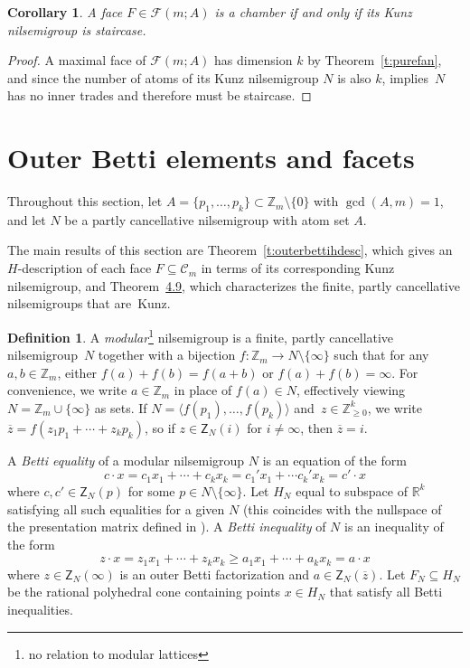 \documentclass[10pt,a4paper]{amsart}
\newcommand\ZZ{\mathbb{Z}}
\newcommand\RR{\mathbb{R}}
\newcommand\cC{{\mathcal C}}
\newtheorem{coro}[thm]{Corollary}
\theoremstyle{definition}\newtheorem{defi}[thm]{Definition}
\begin{document}
\begin{coro}\label{c:chamberstaircase}
A face $F \in \mathcal F(m;A)$ is a chamber if and only if its Kunz nilsemigroup is staircase.   
\end{coro}

\begin{proof}
A maximal face of $\mathcal F(m;A)$ has dimension $k$ by Theorem~\ref{t:purefan}, and since the number of atoms of its Kunz nilsemigroup $N$ is also $k$, \cite[Theorem~4.3]{kunzfaces3} implies~$N$ has no inner trades and therefore must be staircase.  
\end{proof}


\section{Outer Betti elements and facets}
\label{sec:facetouterbetti}

Throughout this section, let $A = \{p_1,\ldots,p_k\} \subset \ZZ_m \setminus \{0\}$ with $\gcd(A,m) = 1$, and let $N$ be a partly cancellative nilsemigroup with atom set $A$.

The main results of this section are Theorem~\ref{t:outerbettihdesc}, which gives an $H$-description of each face $F \subseteq \cC_m$ in terms of its corresponding Kunz nilsemigroup, and Theorem~\href{https://alco.centre-mersenne.org/articles/10.5802/alco.425/}{4.9}, which characterizes the finite, partly cancellative nilsemigroups that are~Kunz.  

\begin{defi}\label{d:modularnilsemigroup}
A \emph{modular}\footnote{no relation to modular lattices} nilsemigroup is a finite, partly cancellative nilsemigroup~$N$ together with a bijection $f : \ZZ_m \to N \setminus \{\infty\}$ such that for any $a,b\in\ZZ_m$, either $f(a) + f(b) = f(a+b)$ or $f(a) + f(b) = \infty$.  For convenience, we write $a \in \ZZ_m$ in place of $f(a) \in N$, effectively viewing $N = \ZZ_m \cup \{\infty\}$ as sets.  If $N = \langle f(p_1), \ldots, f(p_k) \rangle$ and~$z \in \ZZ_{\ge 0}^k$, we write $\overline z = f(z_1p_1 + \cdots + z_kp_k)$, so if $z \in \mathsf Z_N(i)$ for $i \ne \infty$, then $\overline z = i$.  

A \emph{Betti equality} of a modular nilsemigroup $N$ is an equation of the form 
\[
c \cdot x = c_1x_1 + \cdots + c_kx_k = c_1'x_1+ \cdots c_k'x_k = c'\cdot x  
\]
where $c,c' \in \mathsf{Z}_N(p)$ for some $p \in N \setminus \{\infty\}$.  Let $H_N$ equal to subspace of $\RR^k$ satisfying all such equalities for a given $N$ (this coincides with the nullspace of the presentation matrix defined in \cite[Section~4]{kunzfaces3}).  
A \emph{Betti inequality} of $N$ is an inequality of the form 
\[
z \cdot x = z_1x_1 + \cdots + z_kx_k \geq a_1x_1 + \cdots + a_kx_k = a \cdot x  
\]
where $z \in \mathsf{Z}_N(\infty)$ is an outer Betti factorization and $a \in \mathsf{Z}_N(\overline{z})$.  Let $F_N \subseteq H_N$ be the rational polyhedral cone containing points $x \in H_N$ that satisfy all Betti inequalities.  
\end{defi}
\end{document}
